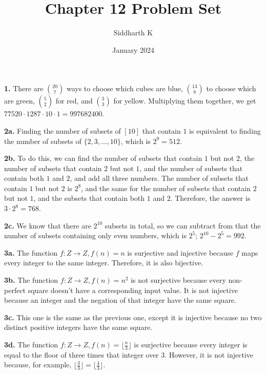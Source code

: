 \documentclass{article}
\title{Chapter 12 Problem Set}
\author{Siddharth K}
\date{January 2024}
\begin{document}
\maketitle

\textbf{1.} There are $20\choose 7$ ways to choose which cubes are blue, $13\choose 8$ to choose which are green, $5\choose 2$ for red, and $3\choose 3$ for yellow. Multiplying them together, we get $77520 \cdot 1287 \cdot 10 \cdot 1 = 997682400$.
\newline

\textbf{2a.} Finding the number of subsets of $[10]$ that contain $1$ is equivalent to finding the number of subsets of $\{2, 3, \ldots, 10\}$, which is $2^9 = 512$.
\newline

\textbf{2b.} To do this, we can find the number of subsets that contain $1$ but not $2$, the number of subsets that contain $2$ but not $1$, and the number of subsets that contain both $1$ and $2$, and add all three numbers. The number of subsets that contain $1$ but not $2$ is $2^8$, and the same for the number of subsets that contain $2$ but not $1$, and the subsets that contain both $1$ and $2$. Therefore, the answer is $3 \cdot 2^8 = 768$.
\newline

\textbf{2c.} We know that there are $2^{10}$ subsets in total, so we can subtract from that the number of subsets containing only even numbers, which is $2^5$; $2^{10} - 2^5 = 992$.
\newline

\textbf{3a.} The function $f:Z \rightarrow Z, f(n) = n$ is surjective and injective because $f$ maps every integer to the same integer. Therefore, it is also bijective.
\newline

\textbf{3b.} The function $f:Z \rightarrow Z, f(n) = n^2$ is not surjective because every non-perfect square doesn't have a corresponding input value. It is not injective because an integer and the negation of that integer have the same square.
\newline

\textbf{3c.} This one is the same as the previous one, except it is injective because no two distinct positive integers have the same square.
\newline

\textbf{3d.} The function $f:Z \rightarrow Z, f(n) = \lfloor \frac{n}{3} \rfloor$ is surjective because every integer is equal to the floor of three times that integer over $3$. However, it is not injective because, for example, $\lfloor \frac{3}{3} \rfloor = \lfloor \frac{4}{3} \rfloor$.
\newline
\end{document}
